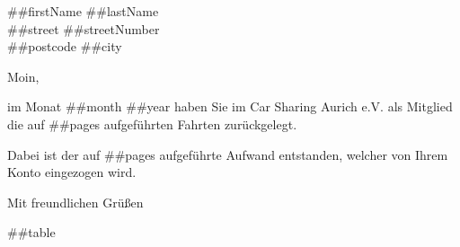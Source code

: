 \documentclass[%
    parskip=half,
    fromalign=right,  %
    fromphone=false, fromfax=false,
    fromrule=false]{scrlttr2}
\begin{document}
\begin{letter}{ ##firstName ##lastName \\ ##street ##streetNumber\\ ##postcode ##city } 

\opening{Moin,}

im Monat ##month ##year haben Sie im Car Sharing Aurich e.V. als Mitglied die auf ##pages aufgeführten Fahrten zurückgelegt.

Dabei ist der auf ##pages aufgeführte Aufwand entstanden, welcher von Ihrem Konto eingezogen wird.

\closing{Mit freundlichen Grüßen}


##table

\end{letter}
\end{document}
